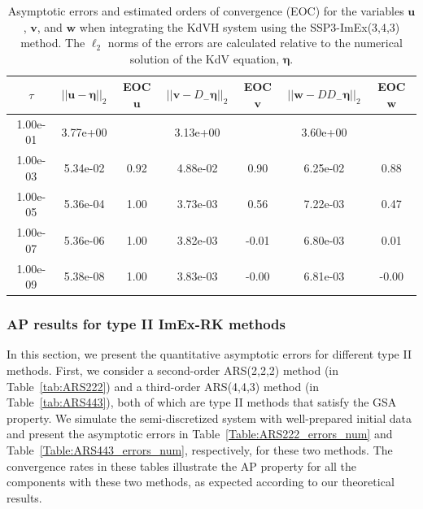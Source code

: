 \documentclass{article}
\newcommand{\ukdv}{\eta}
\begin{document}
\begin{table}[htbp]
    \centering
    \caption{Asymptotic errors and estimated orders of convergence (EOC) for the variables $\pmb{u}$, $\pmb{v}$, and $\pmb{w}$ when integrating
    the KdVH system using the SSP3-ImEx(3,4,3) method. The $\ell_2$ norms of the errors are calculated relative to
    the numerical solution of the KdV equation, $\pmb{\ukdv}$.}
    \label{Table:SSP3-343_errors_num}
    \begin{tabular}{ccccccc}
      \hline
      \hline
      \multicolumn{1}{c}{$\tau$} &
      \multicolumn{1}{c}{$||\pmb{u}-\pmb{\ukdv}||_2$} &
      \multicolumn{1}{c}{EOC $\pmb{u}$} &
      \multicolumn{1}{c}{$||\pmb{v}-D_- \pmb{\ukdv}||_2$} &
      \multicolumn{1}{c}{EOC $\pmb{v}$} &
      \multicolumn{1}{c}{$||\pmb{w}-D D_- \pmb{\ukdv}||_2$} &
      \multicolumn{1}{c}{EOC $\pmb{w}$} \\\hline
      1.00e-01 & 3.77e+00 &  & 3.13e+00 &  & 3.60e+00 &  \\
      1.00e-03 & 5.34e-02 & 0.92 & 4.88e-02 & 0.90 & 6.25e-02 & 0.88 \\
      1.00e-05 & 5.36e-04 & 1.00 & 3.73e-03 & 0.56 & 7.22e-03 & 0.47 \\
      1.00e-07 & 5.36e-06 & 1.00 & 3.82e-03 & -0.01 & 6.80e-03 & 0.01 \\
      1.00e-09 & 5.38e-08 & 1.00 & 3.83e-03 & -0.00 & 6.81e-03 & -0.00 \\
    \end{tabular}
\end{table}


\subsubsection{AP results for type II ImEx-RK methods}
In this section, we present the quantitative asymptotic errors for different type II methods.
First, we consider a second-order ARS(2,2,2) method (in Table~\ref{tab:ARS222}) and a third-order ARS(4,4,3)
method (in Table~\ref{tab:ARS443}), both of which are type II methods that satisfy the GSA property.
We simulate the semi-discretized system with well-prepared initial data and present the asymptotic errors in
Table~\ref{Table:ARS222_errors_num} and Table~\ref{Table:ARS443_errors_num}, respectively, for these two methods.
The convergence rates in these tables illustrate the AP property for all the components with these two methods,
as expected according to our theoretical results.
\end{document}
